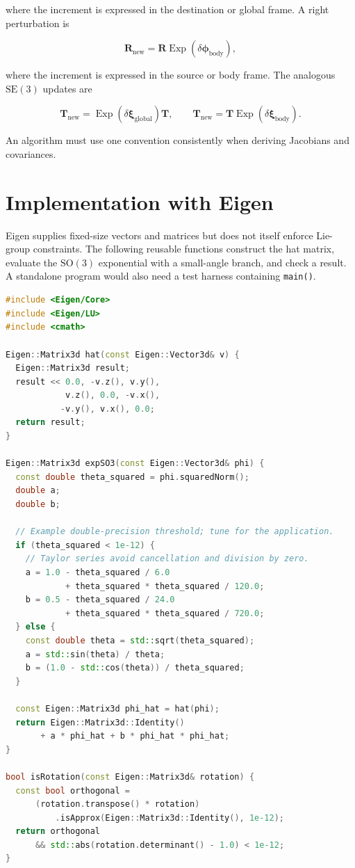 \documentclass[10pt,a4paper]{article}
\numberwithin{equation}{section}
\newcommand{\Section}[1]{\section{#1}}
\newcommand{\SOthree}{\mathrm{SO}(3)}
\newcommand{\SEthree}{\mathrm{SE}(3)}
\newcommand{\Exp}{\operatorname{Exp}}
\newcommand{\vect}[1]{\boldsymbol{#1}}
\theoremstyle{definition}
\theoremstyle{exercisestyle}
\begin{document}
where the increment is expressed in the destination or global frame. A right
perturbation is

\begin{equation}
    \mathbf{R}_{\mathrm{new}}
    =\mathbf{R}\Exp(\delta\vect{\phi}_{\mathrm{body}}),
\end{equation}

where the increment is expressed in the source or body frame. The analogous
$\SEthree$ updates are

\begin{equation}
    \mathbf{T}_{\mathrm{new}}=\Exp(\delta\vect{\xi}_{\mathrm{global}})\mathbf{T},
    \qquad
    \mathbf{T}_{\mathrm{new}}=\mathbf{T}\Exp(\delta\vect{\xi}_{\mathrm{body}}).
\end{equation}

An algorithm must use one convention consistently when deriving Jacobians and
covariances.

\clearpage
\Section{Implementation with Eigen}

Eigen supplies fixed-size vectors and matrices but does not itself enforce
Lie-group constraints. The following reusable functions construct the hat
matrix, evaluate the $\SOthree$ exponential with a small-angle branch, and
check a result. A standalone program would also need a test harness containing
\texttt{main()}.

\begin{lstlisting}[language=C++]
#include <Eigen/Core>
#include <Eigen/LU>
#include <cmath>

Eigen::Matrix3d hat(const Eigen::Vector3d& v) {
  Eigen::Matrix3d result;
  result << 0.0, -v.z(), v.y(),
            v.z(), 0.0, -v.x(),
           -v.y(), v.x(), 0.0;
  return result;
}

Eigen::Matrix3d expSO3(const Eigen::Vector3d& phi) {
  const double theta_squared = phi.squaredNorm();
  double a;
  double b;

  // Example double-precision threshold; tune for the application.
  if (theta_squared < 1e-12) {
    // Taylor series avoid cancellation and division by zero.
    a = 1.0 - theta_squared / 6.0
            + theta_squared * theta_squared / 120.0;
    b = 0.5 - theta_squared / 24.0
            + theta_squared * theta_squared / 720.0;
  } else {
    const double theta = std::sqrt(theta_squared);
    a = std::sin(theta) / theta;
    b = (1.0 - std::cos(theta)) / theta_squared;
  }

  const Eigen::Matrix3d phi_hat = hat(phi);
  return Eigen::Matrix3d::Identity()
       + a * phi_hat + b * phi_hat * phi_hat;
}

bool isRotation(const Eigen::Matrix3d& rotation) {
  const bool orthogonal =
      (rotation.transpose() * rotation)
          .isApprox(Eigen::Matrix3d::Identity(), 1e-12);
  return orthogonal
      && std::abs(rotation.determinant() - 1.0) < 1e-12;
}
\end{lstlisting}
\end{document}
